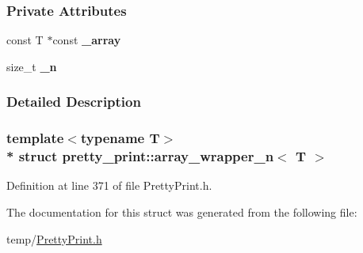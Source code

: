 \subsubsection*{Private Attributes}
\begin{DoxyCompactItemize}
\item 
const T $\ast$const {\bfseries \+\_\+array}\hypertarget{structpretty__print_1_1array__wrapper__n_a1c624bd8bff553e7e0f2c85916dbff7f}{}\label{structpretty__print_1_1array__wrapper__n_a1c624bd8bff553e7e0f2c85916dbff7f}

\item 
size\+\_\+t {\bfseries \+\_\+n}\hypertarget{structpretty__print_1_1array__wrapper__n_a06bcddab367c8b7b86369728065a7f01}{}\label{structpretty__print_1_1array__wrapper__n_a06bcddab367c8b7b86369728065a7f01}

\end{DoxyCompactItemize}


\subsubsection{Detailed Description}
\subsubsection*{template$<$typename T$>$\\*
struct pretty\+\_\+print\+::array\+\_\+wrapper\+\_\+n$<$ T $>$}



Definition at line 371 of file Pretty\+Print.\+h.



The documentation for this struct was generated from the following file\+:\begin{DoxyCompactItemize}
\item 
temp/\hyperlink{PrettyPrint_8h}{Pretty\+Print.\+h}\end{DoxyCompactItemize}
